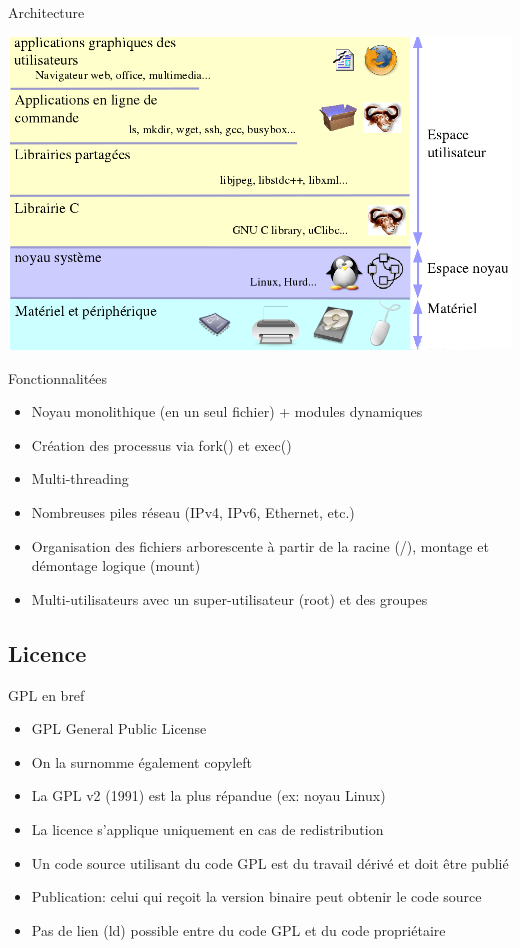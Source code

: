 \begin{frame}{Architecture}{}
  \begin{center}
    \includegraphics[height=0.8\textheight]{pictures/architecture-unix.png}
  \end{center}
\end{frame}

\begin{frame}{Fonctionnalitées}{}
  \begin{itemize}
  \item Noyau monolithique (en un seul fichier) + modules dynamiques
  \item Création des processus via fork() et exec()
  \item Multi-threading
  \item Nombreuses piles réseau (IPv4, IPv6, Ethernet, etc.)
  \item Organisation des fichiers arborescente à partir de la racine (/), montage et démontage logique (mount)
  \item Multi-utilisateurs avec un super-utilisateur (root) et des groupes
  \end{itemize}
\end{frame}

\subsection{Licence}

\begin{frame}{GPL en bref}{}
  \begin{itemize}
  \item GPL General Public License
  \item On la surnomme également copyleft
  \item La GPL v2 (1991) est la plus répandue (ex: noyau Linux)
  \item La licence s'applique uniquement en cas de redistribution
  \item Un code source utilisant du code GPL est du travail dérivé et doit être publié
  \item Publication: celui qui reçoit la version binaire peut obtenir le code source
  \item Pas de lien (ld) possible entre du code GPL et du code propriétaire
  \end{itemize}
\end{frame}

